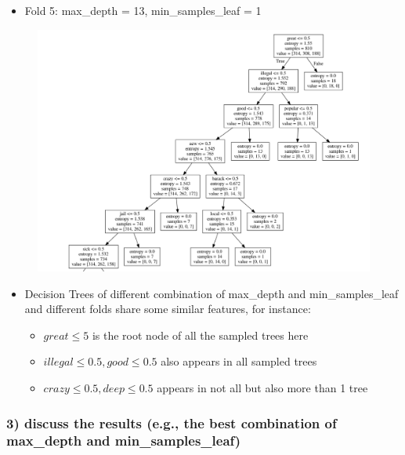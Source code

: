 \documentclass[11pt]{article}
\makeatletter
\def\maxwidth{\ifdim\Gin@nat@width>\linewidth\linewidth
    \else\Gin@nat@width\fi}
\let\Oldincludegraphics\includegraphics
\renewcommand{\includegraphics}[1]{\Oldincludegraphics[width=.8\maxwidth]{#1}}
\providecommand{\tightlist}{%
      \setlength{\itemsep}{0pt}\setlength{\parskip}{0pt}}
\makeatother
\begin{document}
\begin{itemize}
\tightlist
\item
  Fold 5: max\_depth = 13, min\_samples\_leaf = 1
\end{itemize}

\begin{figure}[H]
\centering
\includegraphics{../fold5_13_1.png}
\caption{}
\end{figure}

\begin{itemize}
\tightlist
\item
  Decision Trees of different combination of max\_depth and
  min\_samples\_leaf and different folds share some similar features,
  for instance:

  \begin{itemize}
  \tightlist
  \item
    \(great \le 5\) is the root node of all the sampled trees here
  \item
    \(illegal \le 0.5, good \le 0.5\) also appears in all sampled trees
  \item
    \(crazy \le 0.5, deep \le 0.5\) appears in not all but also more
    than 1 tree
  \end{itemize}
\end{itemize}

    \subsubsection*{3) discuss the results (e.g., the best combination of
max\_depth and
min\_samples\_leaf)}\label{discuss-the-results-e.g.-the-best-combination-of-max_depth-and-min_samples_leaf}
\end{document}
